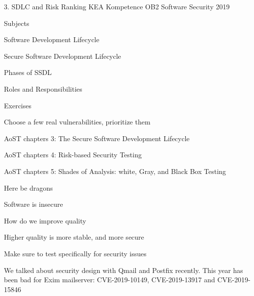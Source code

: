 \documentclass[Screen16to9,17pt]{foils}
\begin{document}
\mytitlepage
{3. SDLC and Risk Ranking}
{KEA Kompetence OB2 Software Security 2019}


\begin{list1}
\item Subjects
\begin{list2}
\item Software Development Lifecycle
\item Secure Software Development Lifecycle
\item Phases of SSDL
\item Roles and Responsibilities
\end{list2}
\item Exercises
\begin{list2}
\item Choose a few real vulnerabilities, prioritize them
\end{list2}
\end{list1}


\begin{list1}
\item AoST chapters 3: The Secure Software Development Lifecycle
\item AoST chapters 4: Risk-based Security Testing
\item AoST chapters 5: Shades of Analysis: white, Gray, and Black Box Testing
\end{list1}



Here be dragons
\begin{list2}
\item Software is insecure
\item How do we improve quality
\item Higher quality is more stable, and more secure
\item Make sure to test specifically for security issues
\end{list2}

We talked about security design with Qmail and Postfix recently. This year has been bad for Exim mailserver: CVE-2019-10149, CVE-2019-13917 and CVE-2019-15846

\end{document}

